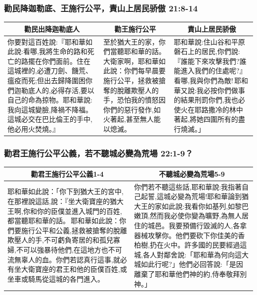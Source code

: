 \subsubsection{勸民降迦勒底、王施行公平，責山上居民骄傲 21:8-14}
\begin{table}[H]
\centering
\begin{tabular}{p{6.5cm}|p{4.25cm}|p{5.25cm}}\hline\hline
\multicolumn{1}{c|}{勸民出降迦勒底人}&\multicolumn{1}{c|}{勸王施行公平}&\multicolumn{1}{c}{責山上居民骄傲}\\\hline
你要對這百姓說:『耶和華如此說:看哪,我將生命的路和死亡的路擺在你們面前。住在這城裡的,必遭刀劍、饑荒、瘟疫而死;但出去歸降圍困你們迦勒底人的,必得存活,要以自己的命為掠物。耶和華說:我向這城變臉,降禍不降福。這城必交在巴比倫王的手中,他必用火焚燒。』
&至於猶大王的家，你們當聽耶和華的話。大衛家啊，耶和華如此說：你們每早晨要施行公平，拯救被搶奪的脫離欺壓人的手，恐怕我的憤怒因你們的惡行發作,如火著起,甚至無人能以熄滅。
&耶和華說:住山谷和平原磐石上的居民,你們說:『誰能下來攻擊我們?誰能進入我們的住處呢?』看哪,我與你們為敵! 耶和華又說:我必按你們做事的結果刑罰你們,我也必使火在耶路撒冷的林中著起,將她四圍所有的盡行燒滅。」\\\hline
\end{tabular}
\end{table}


\subsubsection{勸君王施行公平公義，若不聽城必變為荒場 22:1-9？}
\begin{table}[H]
\centering
\begin{tabular}{p{}|p{8cm}}\hline\hline
\multicolumn{1}{c|}{勸君王施行公平公義1-4}&\multicolumn{1}{c|}{不聽城必變為荒場5-9}\\\hline
耶和華如此說：「你下到猶大王的宮中,在那裡說這話,說：『坐大衛寶座的猶大王啊,你和你的臣僕並進入城門的百姓,都當聽耶和華的話。 耶和華如此說：你們要施行公平和公義,拯救被搶奪的脫離欺壓人的手,不可虧負寄居的和孤兒寡婦,不可以強暴待他們,在這地方也不可流無辜人的血。你們若認真行這事,就必有坐大衛寶座的君王和他的臣僕百姓,或坐車或騎馬從這城的各門進入。
&你們若不聽這些話,耶和華說:我指著自己起誓,這城必變為荒場!耶和華論到猶大王的家如此說:我看你如基列,如黎巴嫩頂,然而我必使你變為曠野,為無人居住的城邑。我要預備行毀滅的人,各拿器械攻擊你。他們要砍下你佳美的香柏樹,扔在火中。許多國的民要經過這城,各人對鄰舍說:「耶和華為何向這大城如此行呢?」他們必回答說:「是因離棄了耶和華他們神的約,侍奉敬拜別神。」\\\hline
\end{tabular}
\end{table}


